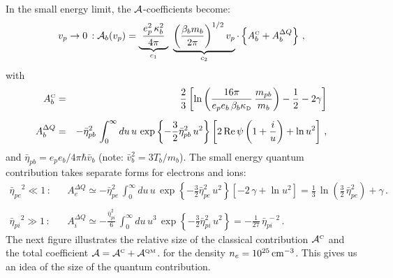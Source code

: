 \documentclass[preprint,12pt,eqsecnum,nofootinbib,amsmath,amssymb]{revtex4}
\newcommand{\smC}{{\rm\scriptscriptstyle C}}
\newcommand{\smD}{{\rm\scriptscriptstyle D}}
\newcommand{\smQM}{{\rm\scriptscriptstyle QM}}
\begin{document}
In the small energy limit, the ${\cal A}$-coefficients become:
\begin{eqnarray}
  v_p \to 0 \,: 
  {\cal A}_b(v_p) 
  =  
  \underbrace{~
  \frac{e_p^2\,\kappa_b^2}{4\pi} 
  ~}_{c_1}
  ~
  \underbrace{
  \left( \frac{\beta_b m_b}{2\pi} \right)^{1/2} v_p 
  }_{c_2}
  \cdot
  \left\{ A_b^\smC + A_b^{\Delta Q} \right\} \,,
\label{low}
\end{eqnarray}
with
\begin{eqnarray}
  A_b^\smC 
  &=& 
  \frac{2}{3} \left[ \ln \left( 
  \frac{16\pi}{e_p e_b \, \beta_b \kappa_\smD} \, \frac{m_{pb}}{m_b}
  \right ) - \frac{1}{2} - 2 \gamma \right]
\label{classvzero}
\\[5pt]
  A_b^{\Delta Q} 
  &=& 
  -\bar\eta_{pb}^2 \,\int_0^\infty du \, u \, 
  \exp\left\{ - \frac{3}{2} \bar\eta_{pb}^2 \, u^2 \right\}
  \left[2 \,  {\rm Re} \, \psi\left( 1 + \frac{i}{u} \right) 
  + \ln u^2 \right] \,,
\label{Dq}
\end{eqnarray}
and $\bar \eta_{pb}=e_p e_b/4\pi \hbar \bar v_b$ (note: $\bar v_b^2 = 3 T_b/m_b$). 
The small energy quantum contribution takes separate
forms for electrons and ions:
\begin{eqnarray}
  {\bar\eta_{pe}}^2 \ll 1 \,:&&
  A_e^{\Delta Q} \simeq  - \bar\eta_{pe}^2 \,
  \int_0^\infty du \, u \, 
  \exp\left\{ - \frac{3}{2} \bar\eta_{pe}^2 \, u^2 \right\}
  \left[- 2 \, \gamma  + \ln u^2 \right] 
  =
  \frac{1}{3} \, \ln\left( \frac{3}{2} \,\bar\eta^2_{pe} \right)
  + \gamma \,.
\nonumber\\
\\[10pt]
{\bar\eta_{pi}}^2 \gg 1 \,:&&
  A_i^{\Delta Q}
  \simeq 
  - \frac{\bar\eta_{pi}^2}{6} \,\int_0^\infty du \, u^3 \, 
  \exp\left\{ - \frac{3}{2} \bar\eta_{pi}^2 \, u^2 \right\}
  =  
  - \frac{1}{27} \, {\bar\eta}_{pi}^{\, -2} \,.
\end{eqnarray}
The next figure illustrates the relative size of the classical
contribution ${\cal A}^\smC$ and the total coefficient ${\cal A}={\cal
A}^\smC + {\cal A}^\smQM$. for the density $n_e=10^{25}\,{\rm
cm}^{-3}$. This gives us an idea of the size of the quantum
contribution.
\vskip-2cm 
\end{document}
